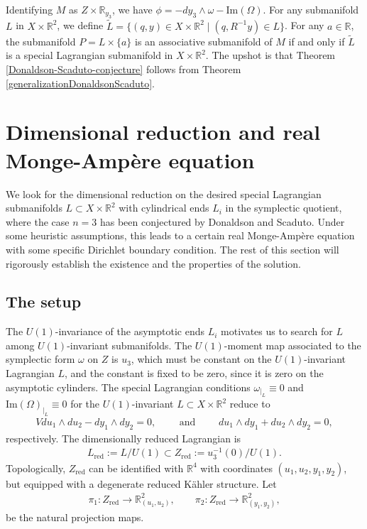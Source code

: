 \documentclass[11pt]{article}
\begin{document}
Identifying $M$ as $Z \times \mathbb{R}_{y_3}$, we have $\phi = -dy_3 \wedge \omega - \text{Im}(\Omega)$. For any submanifold $L$ in $X \times \mathbb{R}^2$, we define $\tilde{L} = \{(q,y) \in X \times \mathbb{R}^2 \; | \; (q, R^{-1}y) \in L \}$. For any $a \in \mathbb{R}$, the submanifold $P = L \times \{a\}$ is an associative submanifold of $M$ if and only if $\tilde{L}$ is a special Lagrangian submanifold in $X \times \mathbb{R}^2$. The upshot is that Theorem \ref{Donaldson-Scaduto-conjecture} follows from Theorem \ref{generalizationDonaldsonScaduto}.





\section{Dimensional reduction and real Monge-Amp\`ere equation}


We look for the dimensional reduction on the desired special Lagrangian submanifolds $L\subset X\times \mathbb{R}^2$ with cylindrical ends $L_i$ in the symplectic quotient, where the case $n=3$ has been conjectured by Donaldson and Scaduto. Under some heuristic assumptions, this leads to a certain real Monge-Amp\`ere equation with some specific Dirichlet boundary condition. The rest of this section will rigorously establish the existence and the properties of the solution. 

\subsection{The setup}\label{setup}

The $U(1)$-invariance of the asymptotic ends $L_i$ motivates us to search for $L$ among $U(1)$-invariant submanifolds. The $U(1)$-moment map associated to the symplectic form $\omega$ on $Z$ is $u_3$, which must be constant on the $U(1)$-invariant Lagrangian $L$, and the constant is fixed to be zero, since it is zero on the asymptotic cylinders. The special Lagrangian conditions $\omega_{|_{L}} \equiv 0$ and $\text{Im}(\Omega)_{|_{L}} \equiv 0$ for the $U(1)$-invariant  $L \subset X \times \mathbb{R}^2$ reduce to 
\begin{align}\label{dim-red-special-lag}
    V du_1 \wedge du_2 - dy_1 \wedge dy_2 = 0, \quad \quad 
    \text{ and } \quad \quad 
    du_1 \wedge dy_1 + du_2 \wedge dy_2 = 0,
\end{align}
respectively. The dimensionally reduced Lagrangian is
\begin{align*}
    L_{\text{red}} := L/U(1) \subset Z_{\text{red}} := u_3^{-1}(0)/U(1).
\end{align*}   
Topologically, $Z_{\text{red}}$ can be identified with $\mathbb{R}^4$ with coordinates $(u_1, u_2, y_1,y_2)$, but equipped with a degenerate reduced Kähler structure. Let 
\begin{align*}
    \pi_1: Z_{\text{red}}\to \mathbb{R}^2_{(u_1,u_2)}, \quad \quad \pi_2: Z_{\text{red}} \to \mathbb{R}^2_{(y_1,y_2)},
\end{align*}
be the natural projection maps.
\end{document}
